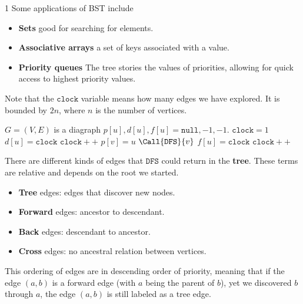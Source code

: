 \begin{multicols}{1}
Some applications of BST include
\begin{itemize}
    \item \textbf{Sets} good for searching for elements. 
    \item \textbf{Associative arrays} a set of keys associated with a value. 
    \item \textbf{Priority queues} The tree stories the values of priorities, allowing for quick access to highest priority values. 
\end{itemize}
Note that the $\texttt{clock}$ variable means how many edges we have explored. It is bounded by $2n$, where $n$ is the number of vertices. 
\begin{algorithm}[H]
\caption{Depth First Search}
    \begin{algorithmic}[1]
    \Require  
    \Ensure 
    \State $G = (V, E)$ is a diagraph
        \State $p[u], d[u], f[u] = \texttt{null}, -1, -1$.
    \EndFor
    \State $\texttt{clock} = 1$
        \State $d[u] = \texttt{clock}$
        \State $\texttt{clock} ++$
                \State $p[v]= u$
                \State $\Call{\texttt{DFS}}{v}$
            \EndIf
        \EndFor
        \State $f[u] = \texttt{clock}$
        \State $\texttt{clock}++$
    \EndProcedure
    \end{algorithmic}
\end{algorithm}

There are different kinds of edges that $\texttt{DFS}$ could return in the \textbf{tree}. These terms are relative and depends on the root we started. 
\begin{itemize}
    \item \textbf{Tree} edges: edges that discover new nodes. 
    \item \textbf{Forward} edges: ancestor to descendant.
    \item \textbf{Back} edges: descendant to ancestor.
    \item \textbf{Cross} edges: no ancestral relation between vertices. 
\end{itemize}
This ordering of edges are in descending order of priority, meaning that if the edge $(a,b)$ is a forward edge (with $a$ being the parent of $b$), yet we discovered $b$ through $a$, the edge $(a,b)$ is still labeled as a tree edge. 


\end{multicols}
